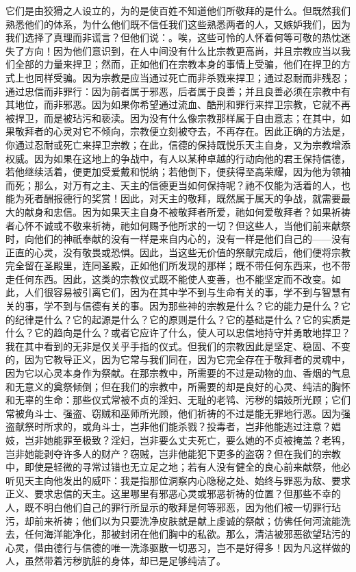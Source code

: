 它们是由狡猾之人设立的，为的是使百姓不知道他们所敬拜的是什么。但既然我们熟悉他们的体系，为什么他们既不信任我们这些熟悉两者的人，又嫉妒我们，因为我们选择了真理而非谎言？但他们说：。唉，这些可怜的人怀着何等可敬的热忱迷失了方向！因为他们意识到，在人中间没有什么比宗教更高尚，并且宗教应当以我们全部的力量来捍卫；然而，正如他们在宗教本身的事情上受骗，他们在捍卫的方式上也同样受骗。因为宗教是应当通过死亡而非杀戮来捍卫；通过忍耐而非残忍；通过忠信而非罪行：因为前者属于邪恶，后者属于良善；并且良善必须在宗教中有其地位，而非邪恶。因为如果你希望通过流血、酷刑和罪行来捍卫宗教，它就不再被捍卫，而是被玷污和亵渎。因为没有什么像宗教那样属于自由意志；在其中，如果敬拜者的心灵对它不倾向，宗教便立刻被夺去，不再存在。因此正确的方法是，你通过忍耐或死亡来捍卫宗教；在此，信德的保持既悦乐天主自身，又为宗教增添权威。因为如果在这地上的争战中，有人以某种卓越的行动向他的君王保持信德，若他继续活着，便更加受爱戴和悦纳；若他倒下，便获得至高荣耀，因为他为领袖而死；那么，对万有之主、天主的信德更当如何保持呢？祂不仅能为活着的人，也能为死者酬报德行的奖赏！因此，对天主的敬拜，既然属于属天的争战，就需要最大的献身和忠信。因为如果天主自身不被敬拜者所爱，祂如何爱敬拜者？如果祈祷者心怀不诚或不敬来祈祷，祂如何赐予他所求的一切？但这些人，当他们前来献祭时，向他们的神祇奉献的没有一样是来自内心的，没有一样是他们自己的——没有正直的心灵，没有敬畏或恐惧。因此，当这些无价值的祭献完成后，他们便将宗教完全留在圣殿里，连同圣殿，正如他们所发现的那样；既不带任何东西来，也不带走任何东西。因此，这类的宗教仪式既不能使人变善，也不能坚定而不改变。如此，人们很容易被引离它们，因为在其中学不到与生命有关的事，学不到与智慧有关的事，学不到与信德有关的事。因为那些神的宗教是什么？它的能力是什么？它的纪律是什么？它的起源是什么？它的原则是什么？它的基础是什么？它的实质是什么？它的趋向是什么？或者它应许了什么，使人可以忠信地持守并勇敢地捍卫？我在其中看到的无非是仅关乎手指的仪式。但我们的宗教因此是坚定、稳固、不变的，因为它教导正义，因为它常与我们同在，因为它完全存在于敬拜者的灵魂中，因为它以心灵本身作为祭献。在那宗教中，所需要的不过是动物的血、香烟的气息和无意义的奠祭倾倒；但在我们的宗教中，所需要的却是良好的心灵、纯洁的胸怀和无辜的生命：那些仪式常被不贞的淫妇、无耻的老鸨、污秽的娼妓所光顾；它们常被角斗士、强盗、窃贼和巫师所光顾，他们祈祷的不过是能无罪地行恶。因为强盗献祭时所求的，或角斗士，岂非他们能杀戮？投毒者，岂非他能逃过注意？娼妓，岂非她能罪至极致？淫妇，岂非要么丈夫死亡，要么她的不贞被掩盖？老鸨，岂非她能剥夺许多人的财产？窃贼，岂非他能犯下更多的盗窃？但在我们的宗教中，即使是轻微的寻常过错也无立足之地；若有人没有健全的良心前来献祭，他必听见天主向他发出的威吓：我是指那位洞察内心隐秘之处、始终与罪恶为敌、要求正义、要求忠信的天主。这里哪里有邪恶心灵或邪恶祈祷的位置？但那些不幸的人，既不明白他们自己的罪行所显示的敬拜是何等邪恶，因为他们被一切罪行玷污，却前来祈祷；他们以为只要洗净皮肤就是献上虔诚的祭献；仿佛任何河流能洗去，任何海洋能净化，那被封闭在他们胸中的私欲。那么，清洁被邪恶欲望玷污的心灵，借由德行与信德的唯一洗涤驱散一切恶习，岂不是好得多！因为凡这样做的人，虽然带着污秽肮脏的身体，却已是足够纯洁了。\par

